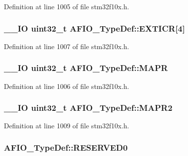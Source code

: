 Definition at line 1005 of file stm32f10x.\-h.

\hypertarget{struct_a_f_i_o___type_def_a5f590aa12271be60c2f61b0a6d2b8772}{
\subsubsection[{E\-X\-T\-I\-C\-R}]{\setlength{\rightskip}{0pt plus 5cm}\-\_\-\-\_\-\-I\-O {\bf uint32\-\_\-t} A\-F\-I\-O\-\_\-\-Type\-Def\-::\-E\-X\-T\-I\-C\-R\mbox{[}4\mbox{]}}}\label{struct_a_f_i_o___type_def_a5f590aa12271be60c2f61b0a6d2b8772}


Definition at line 1007 of file stm32f10x.\-h.

\hypertarget{struct_a_f_i_o___type_def_a2b44ba1a427df7d8c0b254f869b9b463}{
\subsubsection[{M\-A\-P\-R}]{\setlength{\rightskip}{0pt plus 5cm}\-\_\-\-\_\-\-I\-O {\bf uint32\-\_\-t} A\-F\-I\-O\-\_\-\-Type\-Def\-::\-M\-A\-P\-R}}\label{struct_a_f_i_o___type_def_a2b44ba1a427df7d8c0b254f869b9b463}


Definition at line 1006 of file stm32f10x.\-h.

\hypertarget{struct_a_f_i_o___type_def_a4420b9fe25158ac2e5e32f6ad9d1b6ca}{
\subsubsection[{M\-A\-P\-R2}]{\setlength{\rightskip}{0pt plus 5cm}\-\_\-\-\_\-\-I\-O {\bf uint32\-\_\-t} A\-F\-I\-O\-\_\-\-Type\-Def\-::\-M\-A\-P\-R2}}\label{struct_a_f_i_o___type_def_a4420b9fe25158ac2e5e32f6ad9d1b6ca}


Definition at line 1009 of file stm32f10x.\-h.

\hypertarget{struct_a_f_i_o___type_def_a6cf52816787797115664f0c8167a92b9}{
\subsubsection[{R\-E\-S\-E\-R\-V\-E\-D0}]{ A\-F\-I\-O\-\_\-\-Type\-Def\-::\-R\-E\-S\-E\-R\-V\-E\-D0}}\label{struct_a_f_i_o___type_def_a6cf52816787797115664f0c8167a92b9}


